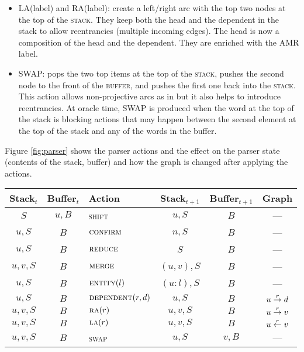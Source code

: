 \documentclass[11pt,a4paper]{article}
\begin{document}
\begin{itemize}
  \item \textsc{LA}(label) and  \textsc{RA}(label): create a left/right arc with the top two 
  nodes at the top of the \textsc{stack}. They keep both the head and the dependent in the stack to allow 
  reentrancies (multiple incoming edges). The head is now a composition of the head and the dependent. 
  They are enriched with the AMR label.
    
   \item \textsc{SWAP}:  pops the two top items at the top of the \textsc{stack}, pushes the second node to 
   the front of the \textsc{buffer}, and pushes the first one back into the
    \textsc{stack}.  This action allows non-projective arcs as in \cite{nivre2009non} 
    but it also helps to introduce reentrancies.
    At oracle time, \textsc{SWAP} is produced when the word at the top of the stack is blocking actions that 
    may happen between the second element at the top of the stack and any of the words in the buffer.    
\end{itemize}

Figure \ref{fig:parser} shows the parser actions and the effect on the parser 
state (contents of the stack, buffer) and how the graph is changed after 
applying the actions.


\begin{figure*}
\centering
\begin{tabular}{cc|l|cc|c}
\textbf{Stack}$_t$ & \textbf{Buffer}$_t$ & \textbf{Action} & \textbf{Stack}$_{t+1}$ & \textbf{Buffer}$_{t+1}$ & \textbf{Graph} \\
\hline
$S$ & $u,B$ & \textsc{shift} & $u,S$ & $B$ & --- \\ 
$u, S$ & $B$  &$\textsc{confirm}$ & $n,S$ & $B$ & ---   \\
$u, S$ & $B$  &$\textsc{reduce}$ & $S$ & $B$ & --- \\
$u, v,S$ & $B$  &$\textsc{merge}$ & $(u, v),S$ & $B$ &  ---   \\
$u, S$ & $B$  &$\textsc{entity}(l)$ & $(u:l),S$ & $B$ & --- \\
$u, S$ & $B$  &$\textsc{dependent}(r, d)$ & $u,S$ & $B$ & $u \stackrel{\scriptsize{r}}{\rightarrow} d $  \\
$u,v,S$ & $B$  &$\textsc{ra}(r)$ & $u,v,S$ & $B$ & $u \stackrel{\scriptsize{r}}{\rightarrow} v$   \\
$u,v, S$ & $B$ & $\textsc{la}(r)$ & $u,v, S$ & $B$ & $u \stackrel{\scriptsize{r}}{\leftarrow} v$  \\
$u,v,S$ & $B$ & \textsc{swap} & $u,S$ & $v,B$ & ---   
\end{tabular}
\caption{\label{fig:parser}Parser transitions indicating the action applied to the stack and buffer and 
the resulting state. }
\end{figure*}
 
\end{document}

